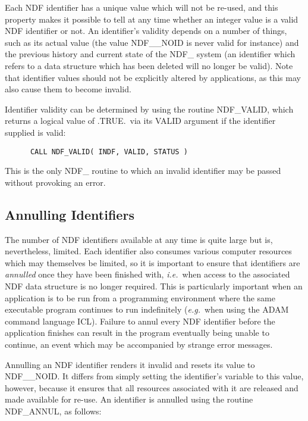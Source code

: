\documentclass[twoside,11pt]{article}
\newcommand{\htmlref}[2]{#1}
\newcommand{\xref}[3]{#1}
\newcommand{\xlabel}[1]{}
\newcommand{\st}[1]{{\em{#1}}}
\begin{document}
Each NDF identifier has a unique value which will not be re-used, and this
property makes it possible to tell at any time whether an integer value is a
valid NDF identifier or not. 
An identifier's validity depends on a number of things, such as its actual
value (the value NDF\_\_NOID is never valid for instance) and the previous
history and current state of the NDF\_ system (an identifier which refers to
a data structure which has been deleted will no longer be valid). 
Note that identifier values should not be explicitly altered by
applications, as this may also cause them to become invalid. 

Identifier validity can be determined by using the routine \htmlref{NDF\_VALID}{NDF_VALID}, which
returns a logical value of .TRUE.\ via its VALID argument if the identifier
supplied is valid: 

\small
\begin{verbatim}
      CALL NDF_VALID( INDF, VALID, STATUS )
\end{verbatim}
\normalsize

This is the only NDF\_ routine to which an invalid identifier may be passed
without provoking an error.

\subsection{\xlabel{annulling_identifiers}\label{ss:annul}Annulling Identifiers}

The number of NDF identifiers available at any time is quite large but is,
nevertheless, limited. 
Each identifier also consumes various computer resources which may
themselves be limited, so it is important to ensure that identifiers are
\st{annulled\/} once they have been finished with, \st{i.e.}\ when access
to the associated NDF data structure is no longer required. 
This is particularly important when an application is to be run from a
programming environment where the same executable program continues to
run indefinitely (\st{e.g.}\ when using the \xref{ADAM}{sg4}{}
command language \xref{ICL}{sg5}{}).
Failure to annul every NDF identifier before the application finishes
can result in the program eventually being unable to continue, an
event which may be accompanied by strange error messages.

Annulling an NDF identifier renders it invalid and resets its value to
NDF\_\_NOID. 
It differs from simply setting the identifier's variable to this value, however,
because it ensures that all resources associated with it are released and made
available for re-use. 
An identifier is annulled using the routine \htmlref{NDF\_ANNUL}{NDF_ANNUL}, as follows:
\end{document}
